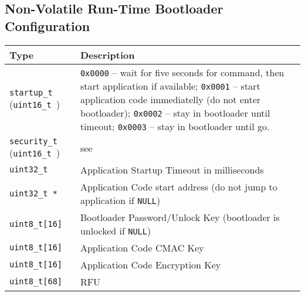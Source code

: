 
\clearpage
\subsection{Non-Volatile Run-Time Bootloader Configuration} \label{sec:cfg:runtime}

\begin{table*}[!ht]
  \hspace*{-4cm}
  \begin{tabular}{| p{4cm} | p{9cm} | }
      \hline
      \rowcolor{SeaGreen3!30!} {\bf Type} & {\bf Description} \\
      \hline
      \hline
      {\tt startup\_t } \newline ({\tt uint16\_t })  & {\tt 0x0000} -- wait for five seconds for command, then start application if available;\newline
                          {\tt 0x0001} -- start application code immediatelly (do not enter bootloader);\newline
                          {\tt 0x0002} -- stay in bootloader until timeout;\newline 
                          {\tt 0x0003} -- stay in bootloader until go.\\
      \hline
      {\tt security\_t } \newline ({\tt uint16\_t }) & see \nameref{sec:arch:secModes}\\
      \hline
      {\tt uint32\_t}    & Application Startup Timeout in milliseconds \\
      \hline
      {\tt uint32\_t *}  & Application Code start address\newline
                           (do not jump to application if {\tt NULL}) \\
      \hline
      {\tt uint8\_t[16]} & Bootloader Password/Unlock Key\newline
                           (bootloader is unlocked if {\tt NULL}) \\
      \hline
      {\tt uint8\_t[16]} & Application Code CMAC Key \\
      \hline
      {\tt uint8\_t[16]} & Application Code Encryption Key \\
      \hline
      {\tt uint8\_t[68]} & RFU \\
      \hline
  \end{tabular}
  \label{tab:cfgStruct}
 \end{table*}
 
